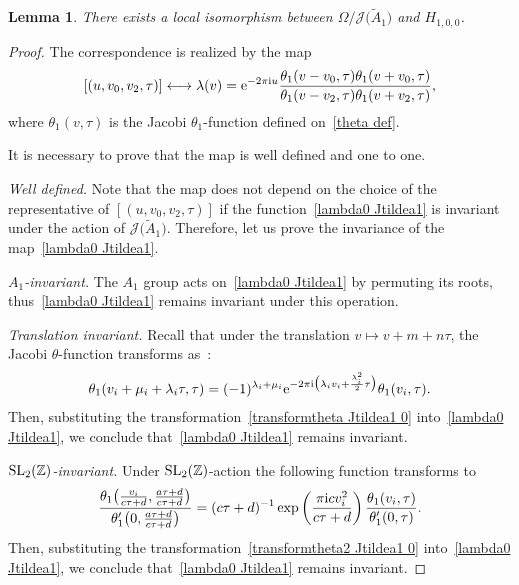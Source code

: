 \documentclass[pdftex]{sigma}%
\numberwithin{equation}{section}
\newtheorem{Lemma}[Theorem]{Lemma}
\newcommand{\Ja}{\mathcal{J}}
\begin{document}
\begin{Lemma}\label{jacobiform1 Jtildea1}
There exists a local isomorphism between $\Omega/\Ja\big(\tilde A_1\big)$ and $H_{1,0,0}$.
\end{Lemma}
\begin{proof}
The correspondence is realized by the map
\begin{gather}\label{lambda0 Jtildea1}
[(u,v_0,v_2,\tau)]\longleftrightarrow \lambda(v)={\rm e}^{-2\pi {\rm i} u}\frac{\theta_1(v-v_0,\tau)\theta_1(v+v_0,\tau)}{\theta_1(v-v_2,\tau)\theta_1(v+v_2,\tau)},
\end{gather}
where $\theta_1(v,\tau)$ is the Jacobi $\theta_1$-function defined on~\eqref{theta def}.

It is necessary to prove that the map is well defined and one to one.

\textit{Well defined.} Note that the map does not depend on the choice of the representative of $[(u,v_0,v_2,\tau)]$ if the function~\eqref{lambda0 Jtildea1} is invariant under the action of $\Ja\big(\tilde A_1\big)$. Therefore, let us prove the invariance of the map~\eqref{lambda0 Jtildea1}.

\textit{$A_1$-invariant.}
The $A_1$ group acts on~\eqref{lambda0 Jtildea1} by permuting its roots, thus~\eqref{lambda0 Jtildea1} remains invariant under this operation.

\textit{Translation invariant.}
 Recall that under the translation $v\mapsto v+m+n\tau$, the Jacobi $\theta$-function transforms as~\cite{E.T.WhittakerandG.N.Watson}:
\begin{gather}
\label{transformtheta Jtildea1 0}
\theta_1(v_i+\mu_i+\lambda_i\tau,\tau)=(-1)^{\lambda_i+\mu_i}{\rm e}^{-2\pi {\rm i}\big(\lambda_iv_i+\frac{\lambda_i^2}{2}\tau\big)}\theta_1(v_i,\tau).
\end{gather}
Then, substituting the transformation~\eqref{transformtheta Jtildea1 0} into~\eqref{lambda0 Jtildea1}, we conclude that~\eqref{lambda0 Jtildea1} remains inva\-riant.

\textit{${\rm SL}_2(\mathbb{Z})$-invariant.}
Under ${\rm SL}_2(\mathbb{Z})$-action the following function transforms to
\begin{gather}\label{transformtheta2 Jtildea1 0}
\frac{\theta_1\big(\frac{v_i}{c\tau+d},\frac{a\tau+d}{c\tau+d}\big)}
{\theta_1^{\prime}\big(0,\frac{a\tau+d}{c\tau+d}\big)}
=(c\tau+d)^{-1}\exp\left(\frac{\pi {\rm i} cv_i^2 }{c\tau+d}\right)\frac{\theta_1(v_i,\tau)}{\theta_1^{\prime}(0,\tau)}.
\end{gather}
Then, substituting the transformation~\eqref{transformtheta2 Jtildea1 0} into~\eqref{lambda0 Jtildea1}, we conclude that~\eqref{lambda0 Jtildea1} remains inva\-riant.


\end{proof}
\end{document}
